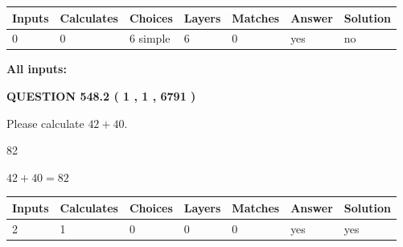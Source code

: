 \documentclass[12pt]{article}
\begin{document}
 
\noindent{}
 
 
   
   
   
   
\noindent\begin{tabular}{|l|l|l|l|l|l|l|}
 \hline
Inputs & Calculates & Choices & Layers & Matches & Answer & Solution \\ \hline
 0  & 
 0  & 
 6
  simple  
  & 
 6  & 
 0  & 
  yes & 
  no 
  \\ \hline
 \end{tabular}
   
   
   
   
\noindent{}
   
   
   
   
\noindent\vspace{0.1in}\hspace{-0.08in} {\textbf{\Large{All inputs: }}}
   
   
  
\vspace{0.2in}
  
{\textbf{\Large{QUESTION
548.2 
 ( 1 , 1 , 6791 )
}}}
  
  
 
Please calculate $ %
42 +  %
40 $.
 
 
 
\noindent{}
 
 

82
 
 
\noindent{}
 
 

 
 
 
\noindent{}
 
 

$ %
42 +  %
40=   %
82$
 
 
\noindent{}
 
 

 
   
   
   
   
\noindent\begin{tabular}{|l|l|l|l|l|l|l|}
 \hline
Inputs & Calculates & Choices & Layers & Matches & Answer & Solution \\ \hline
 2  & 
 1  & 
 0
  & 
 0  & 
 0  & 
  yes & 
  yes 
  \\ \hline
 \end{tabular}
   
\end{document}
